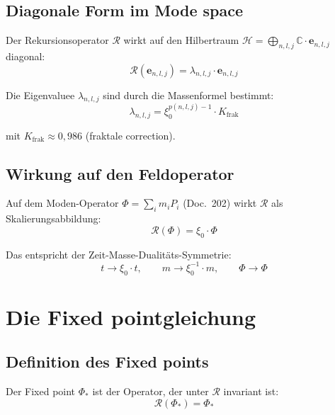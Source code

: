 \subsection{Diagonale Form im Mode space}

Der Rekursionsoperator $\mathcal{R}$ wirkt auf den Hilbertraum
$\mathcal{H} = \bigoplus_{n,l,j}\mathbb{C}\cdot\mathbf{e}_{n,l,j}$
diagonal:
\begin{equation}
  \mathcal{R}(\mathbf{e}_{n,l,j})
  = \lambda_{n,l,j} \cdot \mathbf{e}_{n,l,j}
  \label{eq:R-diagonal}
\end{equation}

Die Eigenvaluee $\lambda_{n,l,j}$ sind durch die Massenformel bestimmt:
\begin{equation}
  \lambda_{n,l,j} = \xi_0^{p(n,l,j)-1} \cdot K_{\text{frak}}
  \label{eq:eigenwerte}
\end{equation}

mit $K_{\text{frak}} \approx 0{,}986$ (fraktale correction).

\subsection{Wirkung auf den Feldoperator}

Auf dem Moden-Operator $\Phi = \sum_i m_i P_i$ (Doc.~202) wirkt
$\mathcal{R}$ als Skalierungsabbildung:
\begin{equation}
  \mathcal{R}(\Phi) = \xi_0 \cdot \Phi
  \label{eq:R-auf-Phi}
\end{equation}

Das entspricht der Zeit-Masse-Dualitäts-Symmetrie:
\begin{equation}
  t \to \xi_0 \cdot t, \qquad m \to \xi_0^{-1} \cdot m,
  \qquad \Phi \to \Phi
  \label{eq:tmd-symmetrie}
\end{equation}

\section{Die Fixed pointgleichung}

\subsection{Definition des Fixed points}

Der Fixed point $\Phi_*$ ist der Operator, der unter $\mathcal{R}$
invariant ist:
\begin{equation}
  \mathcal{R}(\Phi_*) = \Phi_*
  \label{eq:fixpunkt}
\end{equation}

